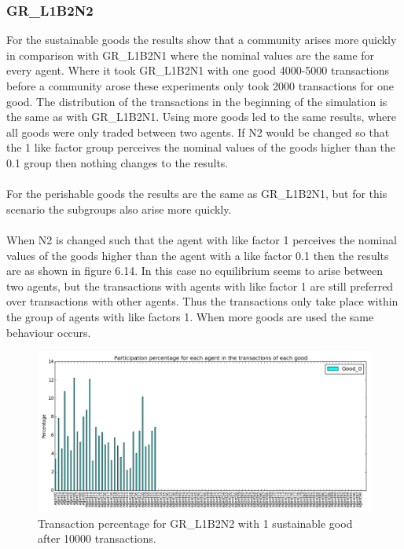 \documentclass[twoside,openright]{uva-bachelor-thesis}
\begin{document}
\clearpage
\subsubsection{GR\_L1B2N2}
For the sustainable goods the results show that a community arises more quickly in comparison with GR\_L1B2N1 where the nominal values are the same for every agent. Where it took GR\_L1B2N1 with one good 4000-5000 transactions before a community arose these experiments only took 2000 transactions for one good. The distribution of the transactions in the beginning of the simulation is the same as with GR\_L1B2N1. Using more goods led to the same results, where all goods were only traded between two agents. If N2 would be changed so that the 1 like factor group perceives the nominal values of the goods higher than the 0.1 group then nothing changes to the results.\\
\\
For the perishable goods the results are the same as GR\_L1B2N1, but for this scenario the subgroups also arise more quickly.
\\
\\
When N2 is changed such that the agent with like factor 1 perceives the nominal values of the goods higher than the agent with a like factor 0.1 then the results are as shown in figure 6.14. In this case no equilibrium seems to arise between two agents, but the transactions with agents with like factor 1 are still preferred over transactions with other agents. Thus the transactions only take place within the group of agents with like factors 1. When more goods are used the same behaviour occurs. \\
\begin{figure}[h!]
\centering
\includegraphics[scale=0.4]{Simulation2_figures/GR_L1B2N2_321/Figure1_10k} 
\caption{Transaction percentage for GR\_L1B2N2 with 1 sustainable good after 10000 transactions.}
\end{figure}
\end{document}
